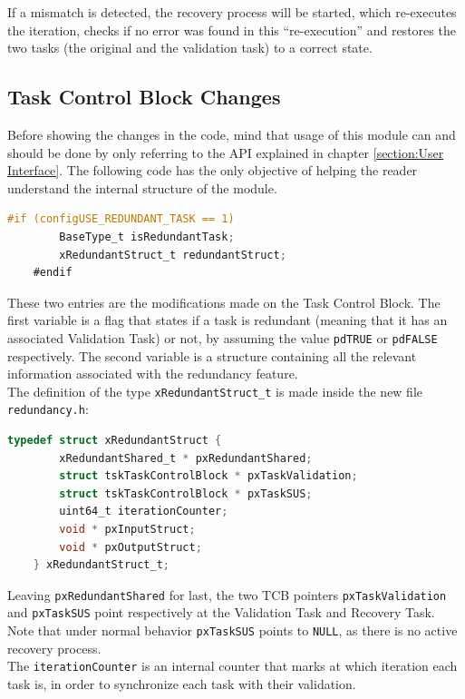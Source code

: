 \documentclass[a4paper, 12pt]{article}
\begin{document}
\begin{onehalfspace}
If a mismatch is detected, the recovery process will be started, which re-executes the iteration, checks if no error was found in this “re-execution” and restores the two tasks (the original and the validation task) to a correct state. 
\subsection {Task Control Block Changes}
Before showing the changes in the code, mind that usage of this module can and should be done by only referring to the API explained in chapter \ref{section:User Interface}. The following code has the only objective of helping the reader understand the internal structure of the module.
\begin{lstlisting}[language=C]
    #if (configUSE_REDUNDANT_TASK == 1)
        BaseType_t isRedundantTask;                    
        xRedundantStruct_t redundantStruct;            
    #endif\end{lstlisting}
These two entries are the modifications made on the Task Control Block. The first variable is a flag that states if a task is redundant (meaning that it has an associated Validation Task) or not, by assuming the value \texttt{pdTRUE} or \texttt{pdFALSE} respectively. The second variable is a structure containing all the relevant information associated with the redundancy feature.
\\
The definition of the type \texttt{xRedundantStruct\_t} is made inside the new file \texttt{redundancy.h}:
\begin{lstlisting}[language=C]
typedef struct xRedundantStruct {
        xRedundantShared_t * pxRedundantShared;        
        struct tskTaskControlBlock * pxTaskValidation; 
        struct tskTaskControlBlock * pxTaskSUS;        
        uint64_t iterationCounter;                     
        void * pxInputStruct;                          
        void * pxOutputStruct;                         
    } xRedundantStruct_t;
    \end{lstlisting}         
Leaving \texttt{pxRedundantShared} for last, the two TCB pointers \texttt{pxTaskValidation} and \texttt{pxTaskSUS} point respectively at the Validation Task and Recovery Task. Note that under normal behavior \texttt{pxTaskSUS} points to \texttt{NULL}, as there is no active recovery process. \\
The \texttt{iterationCounter} is an internal counter that marks at which iteration each task is, in order to synchronize each task with their validation.\\

\end{onehalfspace}
\end{document}
